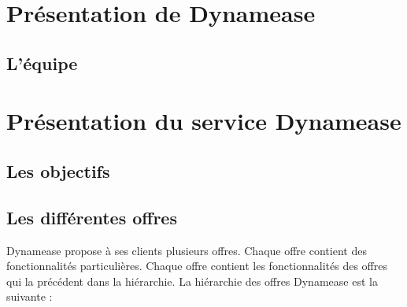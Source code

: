 \section{Présentation de Dynamease}

\subsection{L'équipe}

\section{Présentation du service Dynamease}

\subsection{Les objectifs}

\subsection{Les différentes offres}

Dynamease propose à ses clients plusieurs offres. Chaque offre contient des fonctionnalités particulières. Chaque offre contient les fonctionnalités des offres qui la précédent dans la hiérarchie. La hiérarchie des offres Dynamease est la suivante :

